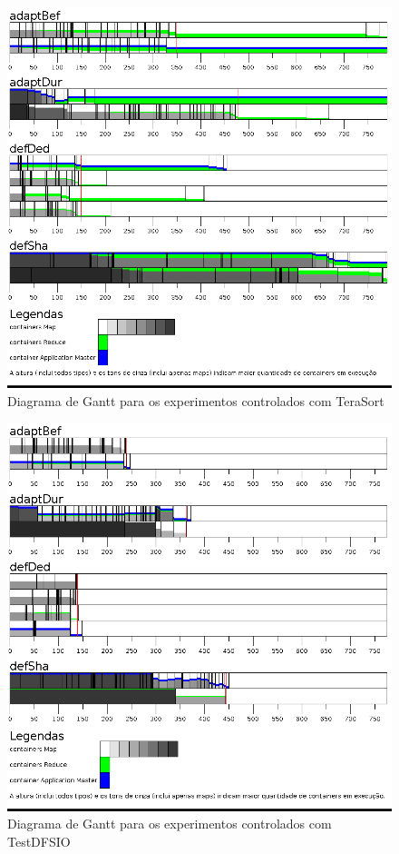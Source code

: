\begin{figure}[!ht]
	\centering
	\includegraphics[width=\textwidth]{figuras/TS-simul.png}
	\caption{Diagrama de Gantt para os experimentos controlados com TeraSort}
	\label{fig:exp1TS}
\end{figure}

\begin{figure}[!ht]
	\centering
	\includegraphics[width=\textwidth]{figuras/DFS-simul.png} %
	\caption{Diagrama de Gantt para os experimentos controlados com TestDFSIO}
	\label{fig:exp1IO}
\end{figure}

